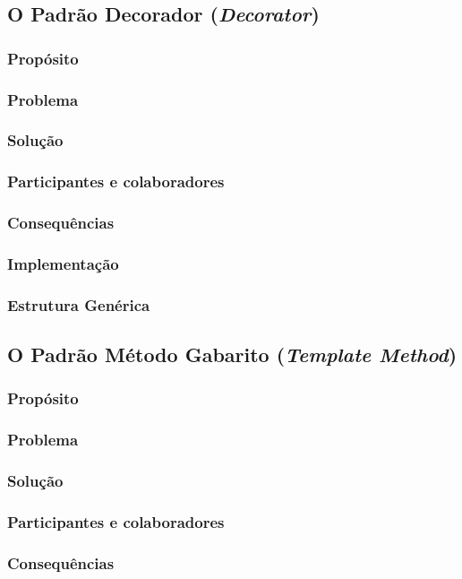 \documentclass[
	11pt,				%
	openright,
	twoside,			%
	a4paper,			%
	english,			%
	french,
	brazil,				%
	sumario=tradicional
	]{abntex2}
\begin{document}
\subsection{O Padrão Decorador (\textit{Decorator})}
\subsubsection{Propósito}
\subsubsection{Problema}
\subsubsection{Solução}
\subsubsection{Participantes e colaboradores}
\subsubsection{Consequências}
\subsubsection{Implementação}
\subsubsection{Estrutura Genérica}

\subsection{O Padrão Método Gabarito (\textit{Template Method})}
\subsubsection{Propósito}
\subsubsection{Problema}
\subsubsection{Solução}
\subsubsection{Participantes e colaboradores}
\subsubsection{Consequências}
\end{document}
